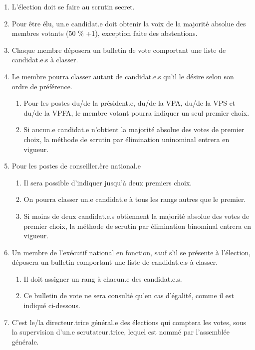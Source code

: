 \begin{enumerate}
 \item
  L'élection doit se faire au scrutin secret.
 \item
  Pour être élu, un.e candidat.e doit obtenir la voix de la majorité absolue des membres votants (50 \% +1), exception faite des abstentions.
 \item
  Chaque membre déposera un bulletin de vote comportant une liste de candidat.e.s à classer.
 \item
  Le membre pourra classer autant de candidat.e.s qu'il le désire selon son ordre de préférence.

  \begin{enumerate}
   \item
    Pour les postes du/de la président.e, du/de la VPA, du/de la VPS et du/de la VPFA, le membre votant pourra indiquer un seul premier choix.
   \item
    Si aucun.e candidat.e n'obtient la majorité absolue des votes de premier choix, la méthode de scrutin par élimination uninominal entrera en vigueur.
  \end{enumerate}
 \item
  Pour les postes de conseiller.ère national.e

  \begin{enumerate}
   \item
    Il sera possible d'indiquer jusqu'à deux premiers choix.
   \item
    On pourra classer un.e candidat.e à tous les rangs autres que le premier.
   \item
    Si moins de deux candidat.e.s obtiennent la majorité absolue des votes de premier choix, la méthode de scrutin par élimination binominal entrera en vigueur.
  \end{enumerate}
 \item
  Un membre de l'exécutif national en fonction, sauf s'il se présente à l'élection, déposera un bulletin comportant une liste de candidat.e.s à classer.

  \begin{enumerate}
   \item
    Il doit assigner un rang à chacun.e des candidat.e.s.
   \item
    Ce bulletin de vote ne sera consulté qu'en cas d'égalité, comme il est indiqué ci-dessous.
  \end{enumerate}
 \item
  C'est le/la directeur.trice général.e des élections qui comptera les votes, sous la supervision d'un.e scrutateur.trice, lequel est nommé par l'assemblée générale.
\end{enumerate}

